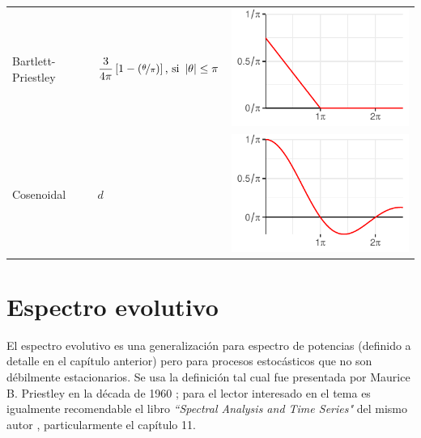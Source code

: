 \documentclass[12pt,letterpaper]{book}
\newcommand{\abso}[1]{\left| #1 \right|}
\begin{document}
\begin{table}
\begin{small}
\begin{tabular}{lll}
\rowcolor{gris}
Bartlett-Priestley &
$\displaystyle 
\frac{3}{4 \pi} \left[ 1 - \left( \nicefrac{\theta}{\pi} \right) \right]
\text{, si } \abso{\theta}\leq \pi
$
& \includegraphics[scale=.4]{./img_ventanas/ventana_2_bartlet_priestley.pdf} \\
Cosenoidal &
$\displaystyle 
d
$
& \includegraphics[scale=.4]{./img_ventanas/ventana_2_bartlett.pdf} \\
\bottomrule
\end{tabular}
\end{small}
\end{table}


\chapter{Espectro evolutivo}
\label{capitulo:espectro_evo}

El espectro evolutivo es una generalización para espectro de potencias (definido a detalle en el capítulo anterior) pero para procesos estocásticos que no son débilmente estacionarios.
%
Se usa la definición tal cual fue presentada por Maurice B. Priestley en la década de 1960 \cite{Priestley65,Priestley66,Priestley69};
%
para el lector interesado en el tema es igualmente recomendable el libro \textit{``Spectral Analysis and Time Series"} del mismo autor \cite{Priestley81}, particularmente el capítulo 11.
\end{document}
